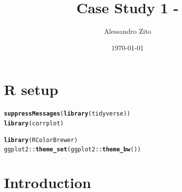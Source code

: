 \documentclass{article}\usepackage[]{graphicx}\usepackage[]{color}
\makeatletter
\newcommand{\hlopt}[1]{\textcolor[rgb]{0,0,0}{#1}}%
\newcommand{\hlstd}[1]{\textcolor[rgb]{0.345,0.345,0.345}{#1}}%
\newcommand{\hlkwd}[1]{\textcolor[rgb]{0.737,0.353,0.396}{\textbf{#1}}}%
\newenvironment{kframe}{%
 \def\at@end@of@kframe{}%
 \ifinner\ifhmode%
  \def\at@end@of@kframe{\end{minipage}}%
  \begin{minipage}{\columnwidth}%
 \fi\fi%
 \def\FrameCommand##1{\hskip\@totalleftmargin \hskip-\fboxsep
 \colorbox{shadecolor}{##1}\hskip-\fboxsep
     \hskip-\linewidth \hskip-\@totalleftmargin \hskip\columnwidth}%
 \MakeFramed {\advance\hsize-\width
   \@totalleftmargin\z@ \linewidth\hsize
   \@setminipage}}%
 {\par\unskip\endMakeFramed%
 \at@end@of@kframe}
\newenvironment{knitrout}{}{} %
\makeatother
\begin{document}
\title{Case Study 1 - }
\author{Alessandro Zito}
\date{\today}
\maketitle

\section*{R setup}
\begin{knitrout}
\color{fgcolor}\begin{kframe}
\begin{alltt}
\hlkwd{suppressMessages}\hlstd{(}\hlkwd{library}\hlstd{(tidyverse))}
\hlkwd{library}\hlstd{(corrplot)}
\end{alltt}


{\ttfamily\noindent\itshape\color{messagecolor}{\#\# corrplot 0.84 loaded}}\begin{alltt}
\hlkwd{library}\hlstd{(RColorBrewer)}
\hlstd{ggplot2}\hlopt{::}\hlkwd{theme_set}\hlstd{(ggplot2}\hlopt{::}\hlkwd{theme_bw}\hlstd{())}
\end{alltt}
\end{kframe}
\end{knitrout}

\section{Introduction}
\end{document}
